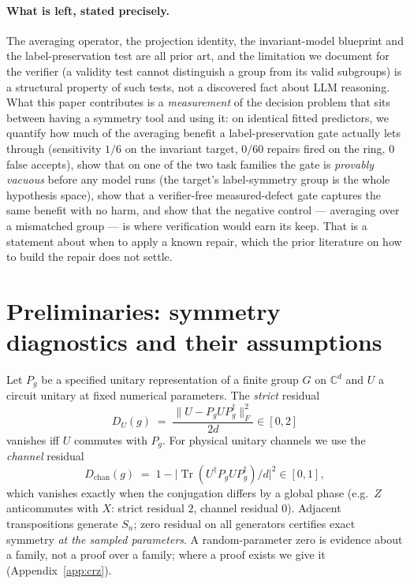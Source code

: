 \documentclass{neurips_2024}
\newcommand{\Dc}{D_{\mathrm{chan}}}
\begin{document}
\paragraph{What is left, stated precisely.} The averaging operator, the projection identity,
the invariant-model blueprint and the label-preservation test are all prior art, and the
limitation we document for the verifier (a validity test cannot distinguish a group from its
valid subgroups) is a structural property of such tests, not a discovered fact about LLM
reasoning. What this paper contributes is a \emph{measurement} of the decision problem that
sits between having a symmetry tool and using it: on identical fitted predictors, we quantify
how much of the averaging benefit a label-preservation gate actually lets through
(sensitivity $1/6$ on the invariant target, $0/60$ repairs fired on the ring, $0$ false
accepts), show that on one of the two task families the gate is \emph{provably vacuous} before
any model runs (the target's label-symmetry group is the whole hypothesis space), show that a
verifier-free measured-defect gate captures the same benefit with no harm, and show that the
negative control --- averaging over a mismatched group --- is where verification would earn
its keep. That is a statement about when to apply a known repair, which the prior literature
on how to build the repair does not settle.

\section{Preliminaries: symmetry diagnostics and their assumptions}
\label{sec:math}

Let $P_g$ be a specified unitary representation of a finite group $G$ on
$\mathbb{C}^{d}$ and $U$ a circuit unitary at fixed numerical parameters. The
\emph{strict} residual
\begin{equation}
  D_U(g) \;=\; \frac{\lVert U - P_g U P_g^{\dagger}\rVert_F^2}{2d}\in[0,2]
\end{equation}
vanishes iff $U$ commutes with $P_g$. For physical unitary channels we use the
\emph{channel} residual
\begin{equation}
  \Dc(g) \;=\; 1 - \bigl|\operatorname{Tr}(U^{\dagger} P_g U P_g^{\dagger})/d\bigr|^2 \in [0,1],
\end{equation}
which vanishes exactly when the conjugation differs by a global phase (e.g.\ $Z$
anticommutes with $X$: strict residual $2$, channel residual $0$). Adjacent
transpositions generate $S_n$; zero residual on all generators certifies exact symmetry
\emph{at the sampled parameters}. A random-parameter zero is evidence about a family, not
a proof over a family; where a proof exists we give it (Appendix~\ref{app:crz}).
\end{document}
